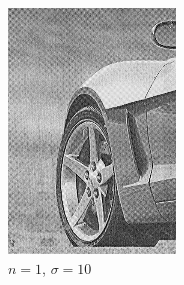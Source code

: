 \documentclass[
	12pt, %
]{style/fphw}
\begin{document}
\begin{figure}[H]
    \centering
        \begin{subfigure}[b]{.22\textwidth}
             \centering
             \includegraphics[width=\textwidth]{Q5_3_1_10.png}
             \caption{$n=1$, $\sigma=10$}
             \label{Q5_3_1_10}
         \end{subfigure}
         \hfill
         \begin{subfigure}[b]{.22\textwidth}
             \centering

\end{subfigure}
\end{figure}
\end{document}
